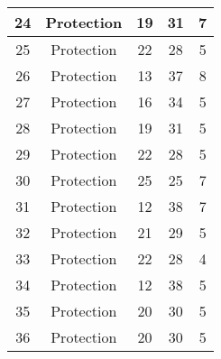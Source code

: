 \documentclass[results.tex]{subfiles}
\begin{document}
\begin{center}
\begin{tabular}{| c || c | c | c | c |}
            \hline
            24                      & Protection                   & 19                     & 31                      & 7                    \\
            \hline
            25                      & Protection                   & 22                     & 28                      & 5                    \\
            \hline
            26                      & Protection                   & 13                     & 37                      & 8                    \\
            \hline
            27                      & Protection                   & 16                     & 34                      & 5                    \\
            \hline
            28                      & Protection                   & 19                     & 31                      & 5                    \\
            \hline
            29                      & Protection                   & 22                     & 28                      & 5                    \\
            \hline
            30                      & Protection                   & 25                     & 25                      & 7                    \\
            \hline
            31                      & Protection                   & 12                     & 38                      & 7                    \\
            \hline
            32                      & Protection                   & 21                     & 29                      & 5                    \\
            \hline
            33                      & Protection                   & 22                     & 28                      & 4                    \\
            \hline
            34                      & Protection                   & 12                     & 38                      & 5                    \\
            \hline
            35                      & Protection                   & 20                     & 30                      & 5                    \\
            \hline
            36                      & Protection                   & 20                     & 30                      & 5                    \\

\end{tabular}
\end{center}
\end{document}
